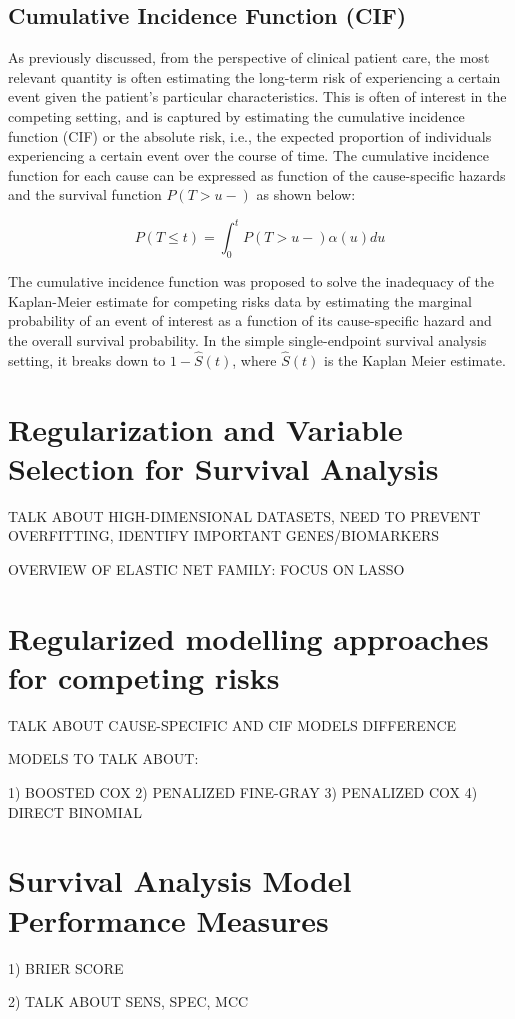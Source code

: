 \subsection{Cumulative Incidence Function (CIF)}

As previously discussed, from the perspective of clinical patient care, the most relevant quantity is often estimating the long-term risk of experiencing a certain event given the patient’s particular characteristics. This is often of interest in the competing setting, and is captured by estimating the cumulative incidence function (CIF) or the absolute risk, i.e., the expected proportion of individuals experiencing a certain event over the course of time. The cumulative incidence function for each cause can be expressed as function of the cause-specific hazards and the survival function $P(T > u-)$ as shown below: 

\begin{equation}
    P(T \leq t) = \int^{t}_{0} P(T > u-) \alpha (u) du
\end{equation}

The cumulative incidence function was proposed to solve the inadequacy of the Kaplan-Meier estimate for competing risks data by estimating the marginal probability of an event of interest as a function of its cause-specific hazard and the overall survival probability. In the simple single-endpoint survival analysis setting, it breaks down to $1- \hat{S}(t)$, where $\hat{S}(t)$ is the Kaplan Meier estimate. 

\section{Regularization and Variable Selection for Survival Analysis}

TALK ABOUT HIGH-DIMENSIONAL DATASETS, NEED TO PREVENT OVERFITTING, IDENTIFY IMPORTANT GENES/BIOMARKERS

OVERVIEW OF ELASTIC NET FAMILY: FOCUS ON LASSO

\section{Regularized modelling approaches for competing risks}

TALK ABOUT CAUSE-SPECIFIC AND CIF MODELS DIFFERENCE 

MODELS TO TALK ABOUT: 

1) BOOSTED COX
2) PENALIZED FINE-GRAY
3) PENALIZED COX
4) DIRECT BINOMIAL

\section{Survival Analysis Model Performance Measures}

1) BRIER SCORE

2) TALK ABOUT SENS, SPEC, MCC

